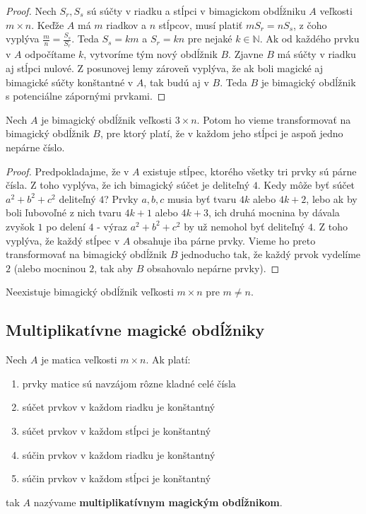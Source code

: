 \begin{proof} Nech $S_r, S_s$ sú súčty v riadku a stĺpci v bimagickom obdĺžniku $A$ veľkosti $m \times n$. Keďže $A$ má $m$ riadkov a $n$ stĺpcov, musí platiť $m S_r = n S_s$, z čoho vyplýva $\frac{m}{n} = \frac{S_s}{S_r}$. Teda $S_s = km$ a $S_r = kn$ pre nejaké $k \in \mathbb{N}$. Ak od každého prvku v $A$ odpočítame $k$, vytvoríme tým nový obdĺžnik $B$. Zjavne $B$ má súčty v riadku aj stĺpci nulové. Z posunovej lemy zároveň vyplýva, že ak boli magické aj bimagické súčty konštantné v $A$, tak budú aj v $B$. Teda $B$ je bimagický obdĺžnik s potenciálne zápornými prvkami.
\end{proof}

\begin{theorem}
\label{rectangleodd}
Nech $A$ je bimagický obdĺžnik veľkosti $3 \times n$. Potom ho vieme transformovať na bimagický obdĺžnik $B$, pre ktorý platí, že v každom jeho stĺpci je aspoň jedno nepárne číslo.
\end{theorem}

\begin{proof} Predpokladajme, že v $A$ existuje stĺpec, ktorého všetky tri prvky sú párne čísla. Z toho vyplýva, že ich bimagický súčet je deliteľný $4$. Kedy môže byť súčet $a^2 + b^2 + c^2$ deliteľný $4$? Prvky $a,b,c$ musia byť tvaru $4k$ alebo $4k+2$, lebo ak by boli ľubovoľné z nich tvaru $4k+1$ alebo $4k+3$, ich druhá mocnina by dávala zvyšok $1$ po delení $4$ - výraz $a^2 + b^2 + c^2$ by už nemohol byť deliteľný $4$. Z toho vyplýva, že každý stĺpec v $A$ obsahuje iba párne prvky. Vieme ho preto transformovať na bimagický obdĺžnik $B$ jednoducho tak, že každý prvok vydelíme $2$ (alebo mocninou $2$, tak aby $B$ obsahovalo nepárne prvky).
\end{proof}

\begin{hypothesis} Neexistuje bimagický obdĺžnik veľkosti $m \times n$ pre $m \neq n$.
\end{hypothesis}



\subsection{Multiplikatívne magické obdĺžniky}

\begin{definition} Nech $A$ je matica veľkosti $m \times n$. Ak platí:

\begin{enumerate}
\item prvky matice sú navzájom rôzne kladné celé čísla
\item súčet prvkov v každom riadku je konštantný
\item súčet prvkov v každom stĺpci je konštantný
\item súčin prvkov v každom riadku je konštantný
\item súčin prvkov v každom stĺpci je konštantný
\end{enumerate}

tak $A$ nazývame \textbf{multiplikatívnym magickým obdĺžnikom}.
\end{definition} 

